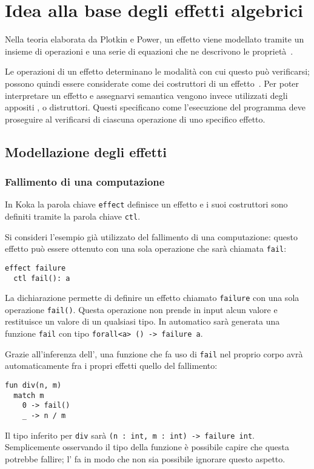\section{Idea alla base degli effetti algebrici}

Nella teoria elaborata da Plotkin e Power, un effetto viene modellato tramite un insieme di operazioni e una serie di equazioni che ne descrivono le proprietà~\cite{cit:handling-algebraic-effects,cit:computational-effects-and-operations-an-overview}.

Le operazioni di un effetto determinano le modalità con cui questo può verificarsi; possono quindi essere considerate come dei costruttori di un effetto~\cite{cit:algebraic-operations-and-generic-effects}.
Per poter interpretare un effetto e assegnarvi semantica vengono invece utilizzati degli appositi , o distruttori. Questi specificano come l'esecuzione del programma deve proseguire al verificarsi di ciascuna operazione di uno specifico effetto.

\subsection{Modellazione degli effetti}
\subsubsection{Fallimento di una computazione}
In Koka la parola chiave \lstinline{effect} definisce un effetto e i suoi costruttori sono definiti tramite la parola chiave \lstinline{ctl}.

Si consideri l'esempio già utilizzato del fallimento di una computazione: questo effetto può essere ottenuto con una sola operazione che sarà chiamata \lstinline{fail}:
\begin{lstlisting}[language=koka]
effect failure
  ctl fail(): a
\end{lstlisting}
La dichiarazione permette di definire un effetto chiamato \lstinline{failure} con una sola operazione \lstinline{fail()}. Questa operazione non prende in input alcun valore e restituisce un valore di un qualsiasi tipo. In automatico sarà generata una funzione \lstinline{fail} con tipo \lstinline{forall<a> () -> failure a}.

Grazie all'inferenza dell', una funzione che fa uso di \lstinline{fail} nel proprio corpo avrà automaticamente fra i propri effetti quello del fallimento:
\begin{lstlisting}[language=koka]
fun div(n, m)
  match m
    0 -> fail()
    _ -> n / m
\end{lstlisting}
Il tipo inferito per \lstinline{div} sarà \lstinline{(n : int, m : int) -> failure int}. Semplicemente osservando il tipo della funzione è possibile capire che questa potrebbe fallire; l' fa in modo che non sia possibile ignorare questo aspetto.


